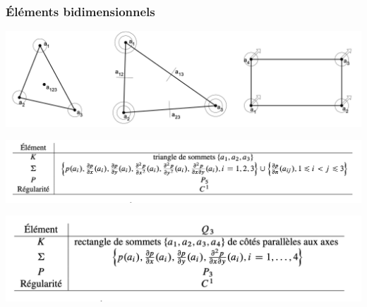 \documentclass{beamer}
\begin{document}
\begin{frame}
\frametitle{Éléments bidimensionnels}
\begin{center}
\includegraphics[scale=0.2]{elementsHermite.png} 
\end{center}
\begin{center}
\includegraphics[scale=0.25]{hermiteBidim1.png} 
\end{center}
\begin{center}
\includegraphics[scale=0.25]{hermiteBidim2.png} 
\end{center}

\end{frame}











\end{document}
